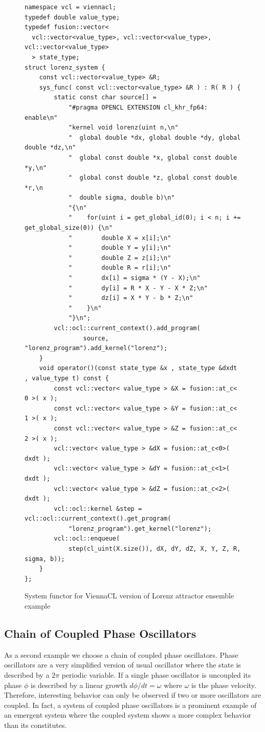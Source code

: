 \documentclass[1p]{elsarticle}
\begin{document}
\begin{figure}
\begin{lstlisting}
namespace vcl = viennacl;
typedef double value_type;
typedef fusion::vector<
  vcl::vector<value_type>, vcl::vector<value_type>, vcl::vector<value_type>
  > state_type;
struct lorenz_system {
    const vcl::vector<value_type> &R;
    sys_func( const vcl::vector<value_type> &R ) : R( R ) {
        static const char source[] =
            "#pragma OPENCL EXTENSION cl_khr_fp64: enable\n"
            "kernel void lorenz(uint n,\n"
            "  global double *dx, global double *dy, global double *dz,\n"
            "  global const double *x, global const double *y,\n"
            "  global const double *z, global const double *r,\n
            "  double sigma, double b)\n"
            "{\n"
            "    for(uint i = get_global_id(0); i < n; i += get_global_size(0)) {\n"
            "        double X = x[i];\n"
            "        double Y = y[i];\n"
            "        double Z = z[i];\n"
            "        double R = r[i];\n"
            "        dx[i] = sigma * (Y - X);\n"
            "        dy[i] = R * X - Y - X * Z;\n"
            "        dz[i] = X * Y - b * Z;\n"
            "    }\n"
            "}\n";
        vcl::ocl::current_context().add_program(
                source, "lorenz_program").add_kernel("lorenz");
    }
    void operator()(const state_type &x , state_type &dxdt , value_type t) const {
        const vcl::vector< value_type > &X = fusion::at_c< 0 >( x );
        const vcl::vector< value_type > &Y = fusion::at_c< 1 >( x );
        const vcl::vector< value_type > &Z = fusion::at_c< 2 >( x );
        vcl::vector< value_type > &dX = fusion::at_c<0>( dxdt );
        vcl::vector< value_type > &dY = fusion::at_c<1>( dxdt );
        vcl::vector< value_type > &dZ = fusion::at_c<2>( dxdt );
        vcl::ocl::kernel &step = vcl::ocl::current_context().get_program(
            "lorenz_program").get_kernel("lorenz");
        vcl::ocl::enqueue(
            step(cl_uint(X.size()), dX, dY, dZ, X, Y, Z, R, sigma, b));
    }
};
\end{lstlisting}
\caption{System functor for ViennaCL version of Lorenz attractor ensemble example}
\label{code:viennacl:lorenz}
\end{figure}

\subsection{Chain of Coupled Phase Oscillators}

As a second example we choose a chain of coupled phase oscillators. Phase
oscillators are a very simplified version of usual oscillator where the state
is described by a $2\pi$ periodic variable. If a single phase oscillator is
uncoupled its phase $\phi$ is described by a linear growth $d\phi/dt = \omega$
where $\omega$ is the phase velocity. Therefore, interesting behavior can only
be observed if two or more oscillators are coupled. In fact, a system of
coupled phase oscillators is a prominent example of an emergent system where
the coupled system shows a more complex behavior than its constitutes.
\end{document}

